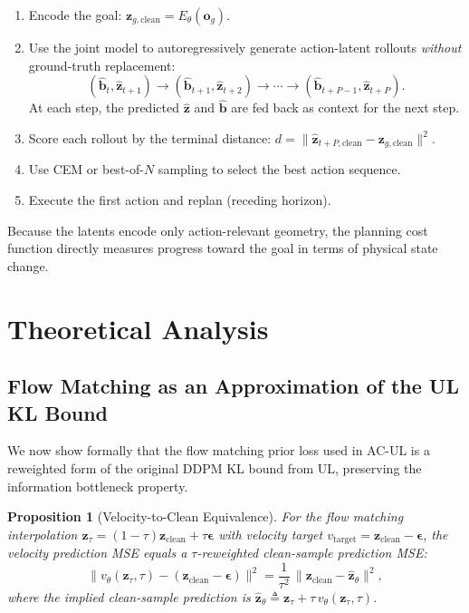 \documentclass{article}
\newtheorem{proposition}{Proposition}
\newcommand{\vo}{\bm{o}}
\newcommand{\vz}{\bm{z}}
\newcommand{\vb}{\bm{b}}
\newcommand{\vep}{\bm{\epsilon}}
\begin{document}
\begin{enumerate}[leftmargin=*,itemsep=2pt]
  \item Encode the goal: $\vz_{g,\text{clean}} = E_\theta(\vo_g)$.
  \item Use the joint model to autoregressively generate action-latent rollouts \emph{without} ground-truth replacement:
  \begin{equation}
    (\hat{\vb}_t, \hat{\vz}_{t+1}) \to (\hat{\vb}_{t+1}, \hat{\vz}_{t+2}) \to \cdots \to (\hat{\vb}_{t+P-1}, \hat{\vz}_{t+P}).
    \label{eq:open_loop_rollout}
  \end{equation}
  At each step, the predicted $\hat{\vz}$ and $\hat{\vb}$ are fed back as context for the next step.
  \item Score each rollout by the terminal distance: $d = \|\hat{\vz}_{t+P,\text{clean}} - \vz_{g,\text{clean}}\|^2$.
  \item Use CEM or best-of-$N$ sampling to select the best action sequence.
  \item Execute the first action and replan (receding horizon).
\end{enumerate}

Because the latents encode only action-relevant geometry, the planning cost function directly measures progress toward the goal in terms of physical state change.

\section{Theoretical Analysis}
\label{sec:theory}

\subsection{Flow Matching as an Approximation of the UL KL Bound}
\label{sec:fm_approx}

We now show formally that the flow matching prior loss used in AC-UL is a reweighted form of the original DDPM KL bound from UL, preserving the information bottleneck property.

\begin{proposition}[Velocity-to-Clean Equivalence]
\label{prop:fm_equiv}
For the flow matching interpolation $\vz_\tau = (1-\tau)\vz_{\text{clean}} + \tau\vep$ with velocity target $v_{\text{target}} = \vz_{\text{clean}} - \vep$, the velocity prediction MSE equals a $\tau$-reweighted clean-sample prediction MSE:
\begin{equation}
  \|v_\theta(\vz_\tau, \tau) - (\vz_{\text{clean}} - \vep)\|^2 = \frac{1}{\tau^2}\,\|\vz_{\text{clean}} - \hat{\vz}_\theta\|^2,
  \label{eq:fm_clean_equiv}
\end{equation}
where the implied clean-sample prediction is $\hat{\vz}_\theta \triangleq \vz_\tau + \tau\, v_\theta(\vz_\tau, \tau)$.
\end{proposition}
\end{document}
